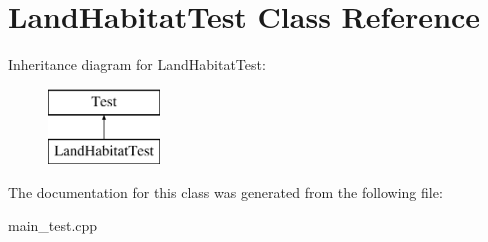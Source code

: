 \hypertarget{class_land_habitat_test}{}\section{Land\+Habitat\+Test Class Reference}
\label{class_land_habitat_test}
Inheritance diagram for Land\+Habitat\+Test\+:\begin{figure}[H]
\begin{center}
\leavevmode
\includegraphics[height=2.000000cm]{class_land_habitat_test}
\end{center}
\end{figure}


The documentation for this class was generated from the following file\+:\begin{DoxyCompactItemize}
\item 
main\+\_\+test.\+cpp\end{DoxyCompactItemize}
